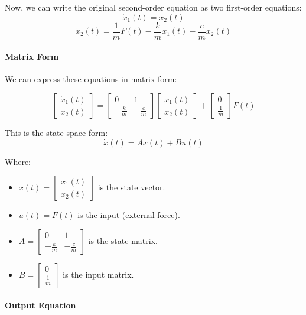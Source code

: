 Now, we can write the original second-order equation as two first-order equations:
\[ \dot{x}_1(t) = x_2(t) \]
\[ \dot{x}_2(t) = \frac{1}{m}F(t) - \frac{k}{m}x_1(t) - \frac{c}{m}x_2(t) \]

\paragraph{Matrix Form} We can express these equations in matrix form:

\[ \begin{bmatrix} \dot{x}_1(t) \\ \dot{x}_2(t) \end{bmatrix} = \begin{bmatrix} 0 & 1 \\ -\frac{k}{m} & -\frac{c}{m} \end{bmatrix} \begin{bmatrix} x_1(t) \\ x_2(t) \end{bmatrix} + \begin{bmatrix} 0 \\ \frac{1}{m} \end{bmatrix} F(t) \]

This is the state-space form:
\[ \dot{x}(t) = Ax(t) + Bu(t) \]

Where:
\begin{itemize}
	\item \( x(t) = \begin{bmatrix} x_1(t) \\ x_2(t) \end{bmatrix} \) is the state vector.
	\item \( u(t) = F(t) \) is the input (external force).
	\item \( A = \begin{bmatrix} 0 & 1 \\ -\frac{k}{m} & -\frac{c}{m} \end{bmatrix} \) is the state matrix.
	\item \( B = \begin{bmatrix} 0 \\ \frac{1}{m} \end{bmatrix} \) is the input matrix.
\end{itemize}

\paragraph{Output Equation} 

